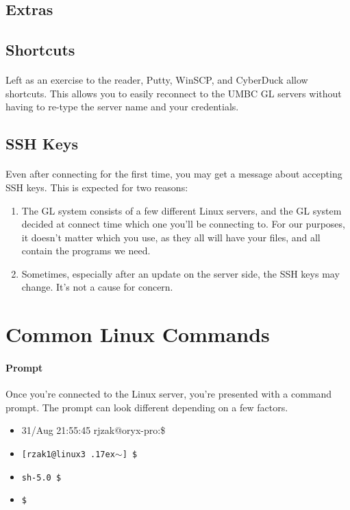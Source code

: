 \documentclass[letter,11pt]{article}
\begin{document}
\FloatBarrier
\subsection{Extras}
\subsection{Shortcuts}
\paragraph{}Left as an exercise to the reader, Putty, WinSCP, and CyberDuck allow shortcuts. This allows you to easily reconnect to the UMBC GL servers without having to re-type the server name and your credentials.

\subsection{SSH Keys}
\paragraph{}Even after connecting for the first time, you may get a message about accepting SSH keys. This is expected for two reasons:

\begin{enumerate}
    \item The GL system consists of a few different Linux servers, and the GL system decided at connect time which one you'll be connecting to. For our purposes, it doesn't matter which you use, as they all will have your files, and all contain the programs we need.
    \item Sometimes, especially after an update on the server side, the SSH keys may change. It's not a cause for concern.
\end{enumerate}

\FloatBarrier
\section{Common Linux Commands}
\paragraph{Prompt}Once you're connected to the Linux server, you're presented with a command prompt. The prompt can look different depending on a few factors.

\begin{itemize}
\item {\color{red}31/Aug 21:55:45} {\color{green}rjzak@oryx-pro}:{}\$
\item \texttt{[rzak1@linux3 {\raise.17ex\hbox{$\scriptstyle\sim$}}] \$}
\item \texttt{sh-5.0 \$}
\item \texttt{\$}
\end{itemize}
\end{document}
